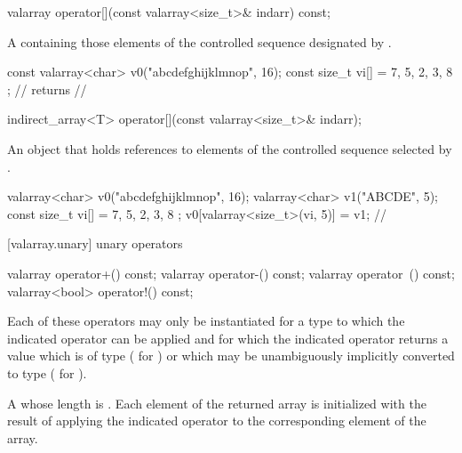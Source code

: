 %
\begin{itemdecl}
valarray operator[](const valarray<size_t>& indarr) const;
\end{itemdecl}

\begin{itemdescr}
\pnum
\returns A  containing those
elements of the controlled sequence designated by .
\begin{example}
\begin{codeblock}
const valarray<char> v0("abcdefghijklmnop", 16);
const size_t vi[] = { 7, 5, 2, 3, 8 };
//  returns
// 
\end{codeblock}
\end{example}
\end{itemdescr}

%
\begin{itemdecl}
indirect_array<T> operator[](const valarray<size_t>& indarr);
\end{itemdecl}

\begin{itemdescr}
\pnum
\returns An object that holds references to elements of the controlled
sequence selected by . \begin{example}
\begin{codeblock}
valarray<char> v0("abcdefghijklmnop", 16);
valarray<char> v1("ABCDE", 5);
const size_t vi[] = { 7, 5, 2, 3, 8 };
v0[valarray<size_t>(vi, 5)] = v1;
// 
\end{codeblock}
\end{example}
\end{itemdescr}

[valarray.unary]{ unary operators}

%
%
%
%
\begin{itemdecl}
valarray operator+() const;
valarray operator-() const;
valarray operator~() const;
valarray<bool> operator!() const;
\end{itemdecl}

\begin{itemdescr}
\pnum
\requires
Each of these operators may only be instantiated for a type 
to which the indicated operator can be applied and for which the indicated
operator returns a value which is of type  ( for
) or which may be unambiguously implicitly converted to type
 ( for ).

\pnum
\returns A  whose length is .
Each element of the returned array is initialized with the result of
applying the indicated operator to the corresponding element of the array.
\end{itemdescr}

